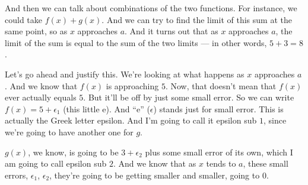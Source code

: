 \documentclass[pdftex, brazil, 12pt, twoside]{article}
\begin{document}
\begin{figure}[H]
  \begin{center}
  \end{center}
\end{figure}

And then we can talk about combinations
of the two functions.
For instance, we could take $f(x) + g(x)$.
And we can try to find the limit of this sum at the same point,
so as $x$ approaches $a$.
And it turns out that as $x$ approaches $a$,
the limit of the sum is equal to the sum of the two limits ---
in other words, $5 + 3 = 8$.

\begin{figure}[H]
  \begin{center}
  \end{center}
\end{figure}

Let's go ahead and justify this.
We're looking at what happens as $x$ approaches $a$.
And we know that $f(x)$ is approaching $5$.
Now, that doesn't mean that $f(x)$ ever actually equals $5$.
But it'll be off by just some small error.
So we can write $f(x) = 5 + \epsilon_1 $ (this little e). And ``e'' ($\epsilon$)
stands just for small error.
This is actually the Greek letter epsilon.
And I'm going to call it epsilon sub $1$,
since we're going to have another one for $g$.

$g(x)$, we know, is going to be $3 + \epsilon_2$
plus some small error of its own,
which I am going to call epsilon sub $2$.
And we know that as $x$ tends to $a$, these small errors,
$\epsilon_1$, $\epsilon_2$, they're going
to be getting smaller and smaller, going to $0$.
\end{document}

